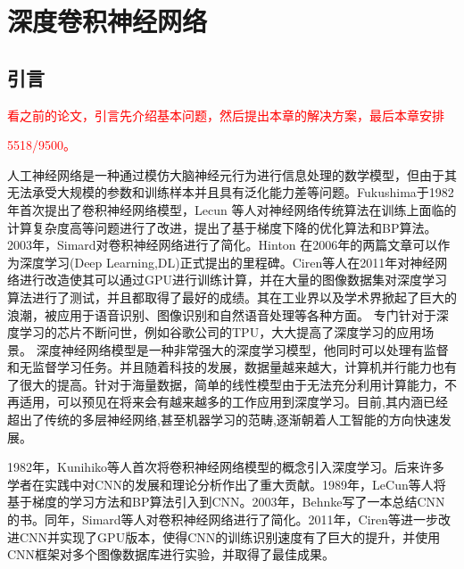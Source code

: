 \chapter{深度卷积神经网络}
\section{引言}
\textcolor{red}{看之前的论文，引言先介绍基本问题，然后提出本章的解决方案，最后本章安排}

\textcolor{red}{5518/9500。}

人工神经网络\cite{hebb2005organization}是一种通过模仿大脑神经元行为进行信息处理的数学模型，但由于其无法承受大规模的参数和训练样本并且具有泛化能力差等问题。Fukushima\cite{fukushima1982neocognitron}于1982年首次提出了卷积神经网络模型，Lecun 等人对神经网络传统算法在训练上面临的计算复杂度高等问题进行了改进，提出了基于梯度下降的优化算法\cite{lecun1998gradient}和BP算法\cite{lecun1989backpropagation}。2003年，Simard对卷积神经网络进行了简化\cite{simard2003best}。Hinton 在2006年的两篇文章\cite{hinton2006reducing,hinton2006fast}可以作为深度学习(Deep Learning,DL)正式提出的里程碑。Ciren等人\cite{ciresan2011flexible}在2011年对神经网络进行改造使其可以通过GPU进行训练计算，并在大量的图像数据集对深度学习算法进行了测试，并且都取得了最好的成绩。其在工业界以及学术界掀起了巨大的浪潮，被应用于语音识别\cite{hinton2012deep}、图像识别\cite{krizhevsky2012imagenet}和自然语音处理\cite{collobert2011natural}等各种方面。 专门针对于深度学习的芯片不断问世，例如谷歌公司的TPU\cite{jouppi2017datacenter}，大大提高了深度学习的应用场景。
深度神经网络模型是一种非常强大的深度学习模型，他同时可以处理有监督和无监督学习任务。并且随着科技的发展，数据量越来越大，计算机并行能力也有了很大的提高。针对于海量数据，简单的线性模型由于无法充分利用计算能力，不再适用，可以预见在将来会有越来越多的工作应用到深度学习。目前,其内涵已经超出了传统的多层神经网络,甚至机器学习的范畴,逐渐朝着人工智能的方向快速发展\cite{silver2017mastering}。

1982年，Kunihiko等人\cite{fukushima1982neocognitron}首次将卷积神经网络模型的概念引入深度学习。后来许多学者在实践中对CNN的发展和理论分析作出了重大贡献。1989年，LeCun等人将基于梯度的学习方法\cite{lecun1998gradient}和BP算法\cite{lecun1989backpropagation}引入到CNN。2003年，Behnke写了一本总结CNN\cite{behnke2003hierarchical}的书。同年，Simard等人\cite{simard2003best}对卷积神经网络进行了简化。2011年，Ciren等\cite{ciresan2011flexible}进一步改进CNN并实现了GPU版本，使得CNN的训练识别速度有了巨大的提升，并使用CNN框架对多个图像数据库进行实验，并取得了最佳成果。

